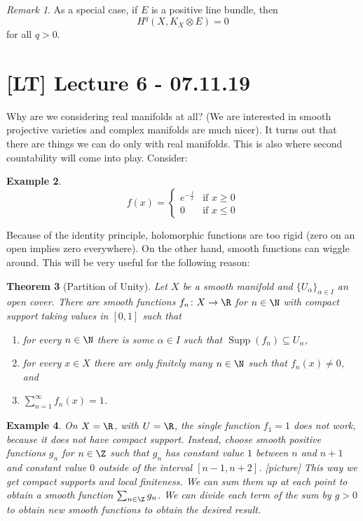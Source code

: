 \documentclass[A4paper, british]{amsart}
\theoremstyle{darkgreentheorem}
\newtheorem{thm}{Theorem}[section]
\theoremstyle{darkbluedefinition}
\theoremstyle{darkredexample}
\newtheorem{exa}[thm]{Example}
\theoremstyle{remark}
\newtheorem{rem}[thm]{Remark}
\DeclareMathOperator{\Supp}{Supp}
\newcommand{\1}{\mathbbm{1}}
\newcommand{\ot}{\otimes}
\begin{document}
\begin{rem}
    As a special case, if $E$ is a positive line bundle, then
    \[H^{q}(X,K_{X}\ot E)=0\]
    for all $q>0$.
\end{rem}

\section{[LT] Lecture 6 - 07.11.19}

Why are we considering real manifolds at all?
(We are interested in smooth projective varieties and complex manifolds are much nicer).
It turns out that there are things we can do only with real manifolds.
This is also where second countability will come into play.
Consider:

\begin{exa}
    \[ f(x)=\begin{cases} e^{-\frac{1}{x}} &\text{if } x\geqslant 0 \\ 0 &\text{if } x\leqslant 0
    \end{cases} \]
\end{exa}
Because of the identity principle, holomorphic functions are too rigid (zero on an open implies zero everywhere).
On the other hand, smooth functions can wiggle around.
This will be very useful for the following reason:

\begin{thm}[Partition of Unity]
    Let $X$ be a smooth manifold and $\{ U_{\alpha}\}_{\alpha\in I}$ an open cover.
    There are smooth functions $f_{n}\colon X\to \R$ for $n\in \N$ with compact support taking values in $[0,1]$ such that
    \begin{enumerate}[label=\roman*)]
	\item for every $n\in \N$ there is some $\alpha\in I$ such that $\Supp(f_{n})\subseteq U_{\alpha}$,
	\item for every $x\in X$ there are only finitely many $n\in \N$ such that $f_{n}(x)\neq 0$, and
	\item $\sum_{n=1}^{\infty} f_{n}(x)=1$.
    \end{enumerate}
\end{thm}

\begin{exa}
    On $X=\R$, with $U=\R$, the single function $f_{1}=1$ does not work, because it does not have compact support.
    Instead, choose smooth positive functions $g_{n}$ for $n\in \Z$ such that $g_{n}$ has constant value $1$ between $n$ and $n+1$ and constant value $0$ outside of the interval $[n-1,n+2]$.
    [picture]
    This way we get compact supports and local finiteness.
    We can sum them up at each point to obtain a smooth function $\sum_{n\in \Z}g_{n}$.
    We can divide each term of the sum by $g>0$ to obtain new smooth functions to obtain the desired result.
\end{exa}
\end{document}
